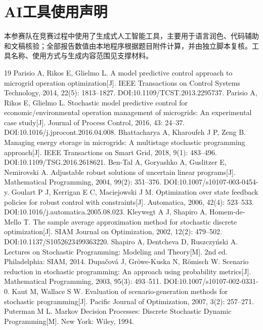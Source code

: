 \documentclass[UTF8,a4paper,zihao=-4,fontset=mac]{ctexart}
\begin{document}
\section*{AI工具使用声明}
本参赛队在竞赛过程中使用了生成式人工智能工具，主要用于语言润色、代码辅助和文稿核验；全部报告数值由本地程序根据题目附件计算，并由独立脚本复核。工具名称、使用方式与生成内容范围见支撑材料。

{\footnotesize
\begin{thebibliography}{19}
\setlength{\itemsep}{0.2em}
 Parisio A, Rikos E, Glielmo L. A model predictive control approach to microgrid operation optimization[J]. IEEE Transactions on Control Systems Technology, 2014, 22(5): 1813--1827. DOI:10.1109/TCST.2013.2295737.
 Parisio A, Rikos E, Glielmo L. Stochastic model predictive control for economic/environmental operation management of microgrids: An experimental case study[J]. Journal of Process Control, 2016, 43: 24--37. DOI:10.1016/j.jprocont.2016.04.008.
 Bhattacharya A, Kharoufeh J P, Zeng B. Managing energy storage in microgrids: A multistage stochastic programming approach[J]. IEEE Transactions on Smart Grid, 2018, 9(1): 483--496. DOI:10.1109/TSG.2016.2618621.
 Ben-Tal A, Goryashko A, Guslitzer E, Nemirovski A. Adjustable robust solutions of uncertain linear programs[J]. Mathematical Programming, 2004, 99(2): 351--376. DOI:10.1007/s10107-003-0454-y.
 Goulart P J, Kerrigan E C, Maciejowski J M. Optimization over state feedback policies for robust control with constraints[J]. Automatica, 2006, 42(4): 523--533. DOI:10.1016/j.automatica.2005.08.023.
 Kleywegt A J, Shapiro A, Homem-de-Mello T. The sample average approximation method for stochastic discrete optimization[J]. SIAM Journal on Optimization, 2002, 12(2): 479--502. DOI:10.1137/S1052623499363220.
 Shapiro A, Dentcheva D, Ruszczyński A. Lectures on Stochastic Programming: Modeling and Theory[M]. 2nd ed. Philadelphia: SIAM, 2014.
 Dupačová J, Gröwe-Kuska N, Römisch W. Scenario reduction in stochastic programming: An approach using probability metrics[J]. Mathematical Programming, 2003, 95(3): 493--511. DOI:10.1007/s10107-002-0331-0.
 Kaut M, Wallace S W. Evaluation of scenario-generation methods for stochastic programming[J]. Pacific Journal of Optimization, 2007, 3(2): 257--271.
 Puterman M L. Markov Decision Processes: Discrete Stochastic Dynamic Programming[M]. New York: Wiley, 1994.

\end{thebibliography}}
\end{document}
